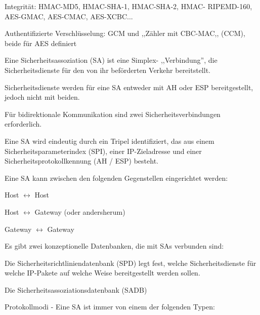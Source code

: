 \documentclass[a4paper]{article}
\begin{document}
\begin{multicols}{3}
\begin{itemize*}
\begin{itemize*}
\begin{itemize*}
                        \item Integrität: HMAC-MD5, HMAC-SHA-1, HMAC-SHA-2, HMAC- RIPEMD-160, AES-GMAC, AES-CMAC, AES-XCBC...
                        \item Authentifizierte Verschlüsselung: GCM und ,,Zähler mit CBC-MAC,, (CCM), beide für AES definiert
                  \end{itemize*}
            \end{itemize*}
            \item Eine Sicherheitsassoziation (SA) ist eine Simplex- ,,Verbindung'', die Sicherheitsdienste für den von ihr beförderten Verkehr bereitstellt.
            \begin{itemize*}
                  \item Sicherheitsdienste werden für eine SA entweder mit AH oder ESP bereitgestellt, jedoch nicht mit beiden.
                  \item Für bidirektionale Kommunikation sind zwei Sicherheitsverbindungen erforderlich.
                  \item Eine SA wird eindeutig durch ein Tripel identifiziert, das aus einem Sicherheitsparameterindex (SPI), einer IP-Zieladresse und einer Sicherheitsprotokollkennung (AH / ESP) besteht.
                  \item Eine SA kann zwischen den folgenden Gegenstellen eingerichtet werden:
                  \begin{itemize*}
                        \item Host $\leftrightarrow$ Host
                        \item Host $\leftrightarrow$ Gateway (oder andersherum)
                        \item Gateway $\leftrightarrow$ Gateway
                  \end{itemize*}
                  \item Es gibt zwei konzeptionelle Datenbanken, die mit SAs verbunden sind:
                  \begin{itemize*}
                        \item Die Sicherheitsrichtliniendatenbank (SPD) legt fest, welche Sicherheitsdienste für welche IP-Pakete auf welche Weise bereitgestellt werden sollen.
                        \item Die Sicherheitsassoziationsdatenbank (SADB)
                  \end{itemize*}
            \end{itemize*}
            \item Protokollmodi - Eine SA ist immer von einem der folgenden Typen:

\end{itemize*}
\end{multicols}
\end{document}
